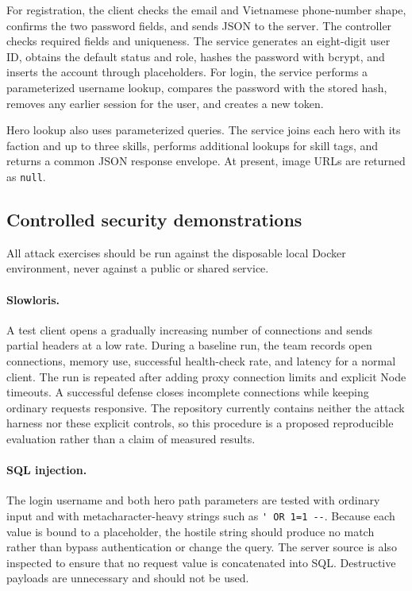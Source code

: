 For registration, the client checks the email and Vietnamese phone-number shape, confirms the two password fields, and sends JSON to the server. The controller checks required fields and uniqueness. The service generates an eight-digit user ID, obtains the default status and role, hashes the password with bcrypt, and inserts the account through placeholders. For login, the service performs a parameterized username lookup, compares the password with the stored hash, removes any earlier session for the user, and creates a new token.

Hero lookup also uses parameterized queries. The service joins each hero with its faction and up to three skills, performs additional lookups for skill tags, and returns a common JSON response envelope. At present, image URLs are returned as \verb|null|.

\subsection{Controlled security demonstrations}

All attack exercises should be run against the disposable local Docker environment, never against a public or shared service.

\paragraph{Slowloris.} A test client opens a gradually increasing number of connections and sends partial headers at a low rate. During a baseline run, the team records open connections, memory use, successful health-check rate, and latency for a normal client. The run is repeated after adding proxy connection limits and explicit Node timeouts. A successful defense closes incomplete connections while keeping ordinary requests responsive. The repository currently contains neither the attack harness nor these explicit controls, so this procedure is a proposed reproducible evaluation rather than a claim of measured results.

\paragraph{SQL injection.} The login username and both hero path parameters are tested with ordinary input and with metacharacter-heavy strings such as \verb|' OR 1=1 --|. Because each value is bound to a placeholder, the hostile string should produce no match rather than bypass authentication or change the query. The server source is also inspected to ensure that no request value is concatenated into SQL. Destructive payloads are unnecessary and should not be used.


